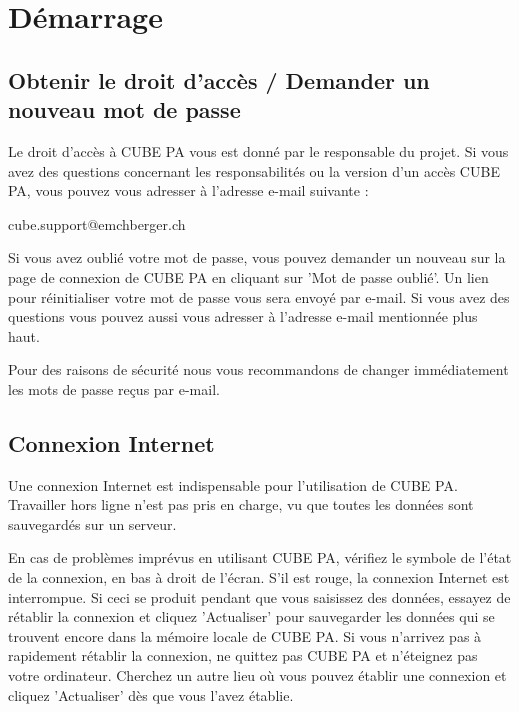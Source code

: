 

\section{Démarrage}
\subsection{Obtenir le droit d'accès / Demander un nouveau mot de passe}


Le droit d'accès à CUBE PA vous est donné par le responsable du projet. Si vous avez des questions concernant les responsabilités ou la version d'un accès CUBE PA, vous pouvez vous adresser à l'adresse e-mail suivante :

\vspace{\baselineskip}

{\color{red} cube.support@emchberger.ch}

\vspace{\baselineskip}

Si vous avez oublié votre mot de passe, vous pouvez demander un nouveau sur la page de connexion de CUBE PA en cliquant sur 'Mot de passe oublié'. Un lien pour réinitialiser votre mot de passe vous sera envoyé par e-mail. Si vous avez des questions vous pouvez aussi vous adresser à l'adresse e-mail mentionnée plus haut.

\vspace{\baselineskip}

Pour des raisons de sécurité nous vous recommandons de changer immédiatement les mots de passe reçus par e-mail.

\subsection{Connexion Internet}

Une connexion Internet est indispensable pour l'utilisation de CUBE PA. Travailler hors ligne n'est pas pris en charge, vu que toutes les données sont sauvegardés sur un serveur.

\vspace{\baselineskip}

En cas de problèmes imprévus en utilisant CUBE PA, vérifiez le symbole de l'état de la connexion, en bas à droit de l'écran. S'il est rouge, la connexion Internet est interrompue. Si ceci se produit pendant que vous saisissez des données, essayez de rétablir la connexion et cliquez 'Actualiser' pour sauvegarder les données qui se trouvent encore dans la mémoire locale de CUBE PA. 
Si vous n'arrivez pas à rapidement rétablir la connexion, ne quittez pas CUBE PA et n'éteignez pas votre ordinateur. Cherchez un autre lieu où vous pouvez établir une connexion et cliquez 'Actualiser' dès que vous l'avez établie.

